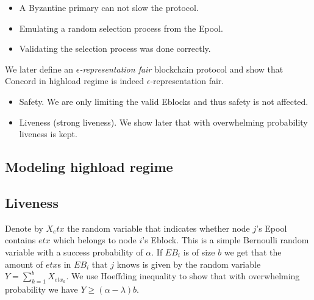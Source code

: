 \begin{itemize}
\item A Byzantine primary can not slow the protocol.  
\item Emulating a random selection process from the Epool.
\item Validating the selection process was done correctly.
\end{itemize}

We later define an \emph{$\epsilon$-representation fair} blockchain protocol and show that Concord in highload regime is indeed $\epsilon$-representation fair.
\begin{itemize}
\item Safety. We are only limiting the valid Eblocks and thus safety is not affected.
\item Liveness (strong liveness). We show later that with overwhelming probability liveness is kept.
\end{itemize}

\subsection{Modeling highload regime}



\subsection{Liveness}



Denote by $X_etx$ the random variable that indicates whether node $j$'s Epool contains $etx$ which belongs to node $i$'s Eblock. This is a simple Bernoulli random variable with a success probability of $\alpha$. If $EB_i$ is of size $b$ we get that the amount of $etx$s in $EB_i$ that $j$ knows is given by the random variable $Y = \sum_{k=1}^b X_{etx_k}$. We use Hoeffding inequality to show that with overwhelming probability we have $Y \geq (\alpha-\lambda)b$.

